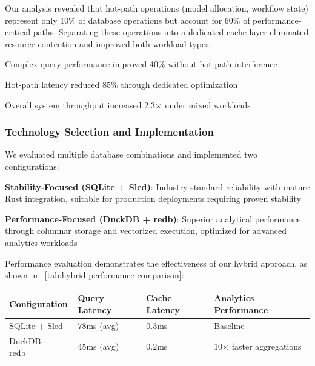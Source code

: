 \begin{infobox}[title=Implementation Insight: Workload Separation Benefits]
Our analysis revealed that hot-path operations (model allocation, workflow state) represent only 10\% of database operations but account for 60\% of performance-critical paths. Separating these operations into a dedicated cache layer eliminated resource contention and improved both workload types:
\begin{compactlist}
    \item Complex query performance improved 40\% without hot-path interference
    \item Hot-path latency reduced 85\% through dedicated optimization
    \item Overall system throughput increased 2.3× under mixed workloads
\end{compactlist}
\end{infobox}

\subsubsection*{Technology Selection and Implementation}

We evaluated multiple database combinations and implemented two configurations:

\begin{expandedlist}
    \item \textbf{Stability-Focused (SQLite + Sled)}: Industry-standard reliability with mature Rust integration, suitable for production deployments requiring proven stability
    \item \textbf{Performance-Focused (DuckDB + redb)}: Superior analytical performance through columnar storage and vectorized execution, optimized for advanced analytics workloads
\end{expandedlist}

Performance evaluation demonstrates the effectiveness of our hybrid approach, as shown in ~\ref{tab:hybrid-performance-comparison}:

\begin{center}
\begin{tabular}{@{}llll@{}}
\toprule
\textbf{Configuration} & \textbf{Query Latency} & \textbf{Cache Latency} & \textbf{Analytics Performance} \\
\midrule
SQLite + Sled & 78ms (avg) & 0.3ms & Baseline \\
DuckDB + redb & 45ms (avg) & 0.2ms & 10× faster aggregations \\
\bottomrule
\end{tabular}
\label{tab:hybrid-performance-comparison}
\end{center}

